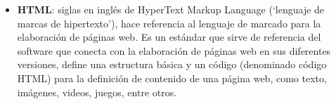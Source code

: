 \begin{itemize}
	\item \textbf{HTML}: siglas en inglés de HyperText Markup Language (‘lenguaje de marcas de hipertexto’), hace referencia al lenguaje de marcado para la elaboración de páginas web. Es un estándar que sirve de referencia del software que conecta con la elaboración de páginas web en sus diferentes versiones, define una estructura básica y un código (denominado código HTML) para la definición de contenido de una página web, como texto, imágenes, videos, juegos, entre otros. \cite{HTML}
	

	
	
	

	
\end{itemize}